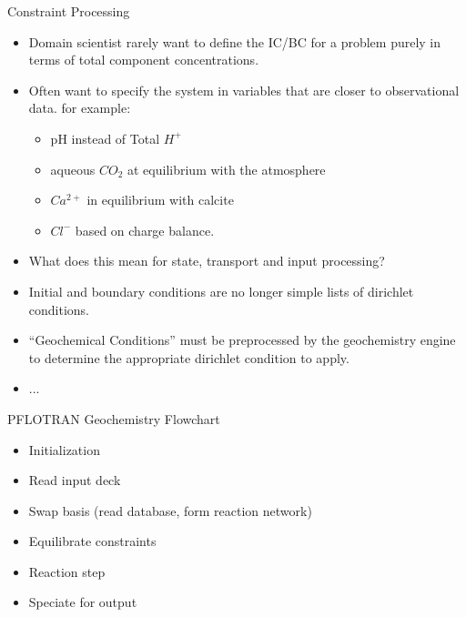 \documentclass{beamer}
\newcommand{\pft}{PFLOTRAN\xspace}
\begin{document}
\begin{frame}{Constraint Processing}
\begin{itemize}
\item Domain scientist rarely want to define the IC/BC for a problem
  purely in terms of total component concentrations.
\item Often want to specify the system in variables that are
  closer to observational data. for example:
  \begin{itemize}
    \item pH instead of Total $H^+$
    \item aqueous $CO_2$ at equilibrium with the atmosphere
    \item $Ca^{2+}$ in equilibrium with calcite
    \item $Cl^-$ based on charge balance.
  \end{itemize}
\item What does this mean for state, transport and input processing?
\item Initial and boundary conditions are no longer simple lists of
  dirichlet conditions.
\item ``Geochemical Conditions'' must be preprocessed by the
  geochemistry engine to determine the appropriate dirichlet condition
  to apply.
\item ...
\end{itemize}
\end{frame}

\begin{frame}{\pft Geochemistry Flowchart}
\begin{itemize}
\item Initialization
\item Read input deck
\item Swap basis (read database, form reaction network)
\item Equilibrate constraints
\item Reaction step
\item Speciate for output
\end{itemize}
\end{frame}
\end{document}
